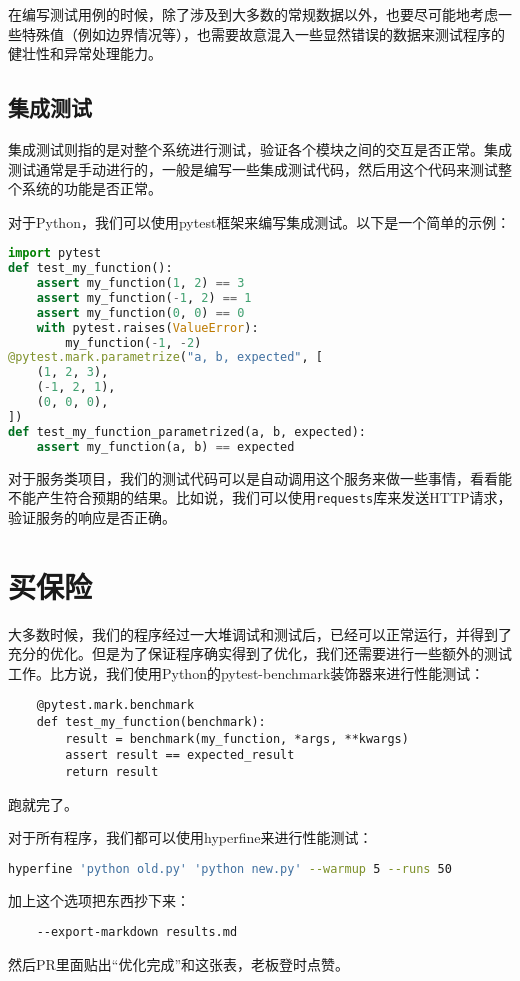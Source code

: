 \documentclass[../main.tex]{subfiles}
\begin{document}
在编写测试用例的时候，除了涉及到大多数的常规数据以外，也要尽可能地考虑一些特殊值（例如边界情况等），也需要故意混入一些显然错误的数据来测试程序的健壮性和异常处理能力。

\subsection{集成测试}

集成测试则指的是对整个系统进行测试，验证各个模块之间的交互是否正常。集成测试通常是手动进行的，一般是编写一些集成测试代码，然后用这个代码来测试整个系统的功能是否正常。

对于Python，我们可以使用pytest框架来编写集成测试。以下是一个简单的示例：
\begin{lstlisting}[language=python]
import pytest
def test_my_function():
    assert my_function(1, 2) == 3
    assert my_function(-1, 2) == 1
    assert my_function(0, 0) == 0
    with pytest.raises(ValueError):
        my_function(-1, -2)
@pytest.mark.parametrize("a, b, expected", [
    (1, 2, 3),
    (-1, 2, 1),
    (0, 0, 0),
])
def test_my_function_parametrized(a, b, expected):
    assert my_function(a, b) == expected
\end{lstlisting}

对于服务类项目，我们的测试代码可以是自动调用这个服务来做一些事情，看看能不能产生符合预期的结果。比如说，我们可以使用\texttt{requests}库来发送HTTP请求，验证服务的响应是否正确。

\section{买保险}

大多数时候，我们的程序经过一大堆调试和测试后，已经可以正常运行，并得到了充分的优化。但是为了保证程序确实得到了优化，我们还需要进行一些额外的测试工作。比方说，我们使用Python的pytest-benchmark装饰器来进行性能测试：
\begin{lstlisting}
    @pytest.mark.benchmark
    def test_my_function(benchmark):
        result = benchmark(my_function, *args, **kwargs)
        assert result == expected_result
        return result
\end{lstlisting}
跑就完了。

对于所有程序，我们都可以使用hyperfine来进行性能测试：
\begin{lstlisting}[language=bash]
    hyperfine 'python old.py' 'python new.py' --warmup 5 --runs 50
\end{lstlisting}
加上这个选项把东西抄下来：
\begin{lstlisting}
    --export-markdown results.md
\end{lstlisting}
然后PR里面贴出“优化完成”和这张表，老板登时点赞。
\end{document}
